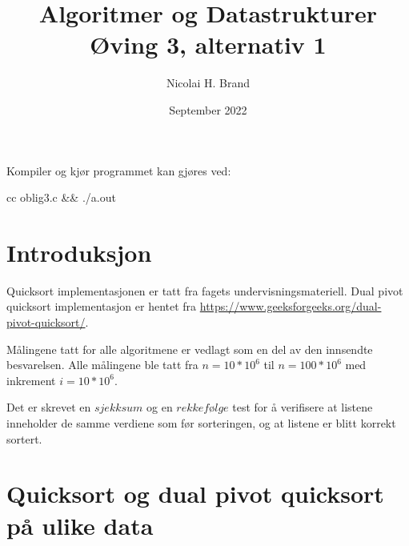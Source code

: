 \documentclass{article}
\title{Algoritmer og Datastrukturer Øving 3, alternativ 1}
\author{Nicolai H. Brand}
\date{September 2022}
\begin{document}
\maketitle

Kompiler og kjør programmet kan gjøres ved:
\begin{ffcode}
cc oblig3.c && ./a.out
\end{ffcode}

\section{Introduksjon}
Quicksort implementasjonen er tatt fra fagets undervisningsmateriell. Dual pivot quicksort implementasjon er hentet fra \hyperlink{geksforgeeks.com }{https://www.geeksforgeeks.org/dual-pivot-quicksort/}.

Målingene tatt for alle algoritmene er vedlagt som en del av den innsendte besvarelsen. Alle målingene ble tatt fra $n = 10 * 10^6$ til $n = 100 * 10^6$ med inkrement $i = 10 * 10^6$.

Det er skrevet en $sjekksum$ og en $rekkefølge$ test for å verifisere at listene inneholder de samme verdiene som før sorteringen, og at listene er blitt korrekt sortert.

\newpage

\section{Quicksort og dual pivot quicksort på ulike data}
\end{document}
